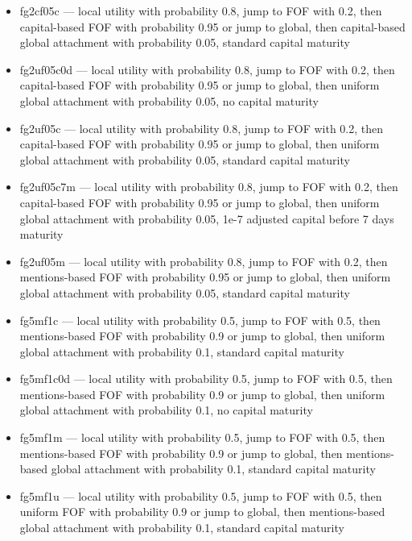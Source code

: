 \documentclass[10pt,oneside]{memoir}
\begin{document}
\begin{itemize}


\item fg2cf05c --- local utility with probability 0.8, jump to FOF with 0.2, then capital-based FOF with probability 0.95 or jump to global, then capital-based global attachment with probability 0.05, standard capital maturity

\item fg2uf05c0d --- local utility with probability 0.8, jump to FOF with 0.2, then capital-based FOF with probability 0.95 or jump to global, then uniform global attachment with probability 0.05, no capital maturity

\item fg2uf05c --- local utility with probability 0.8, jump to FOF with 0.2, then capital-based FOF with probability 0.95 or jump to global, then uniform global attachment with probability 0.05, standard capital maturity

\item fg2uf05c7m --- local utility with probability 0.8, jump to FOF with 0.2, then capital-based FOF with probability 0.95 or jump to global, then uniform global attachment with probability 0.05, 1e-7 adjusted capital before 7 days maturity

\item fg2uf05m --- local utility with probability 0.8, jump to FOF with 0.2, then mentions-based FOF with probability 0.95 or jump to global, then uniform global attachment with probability 0.05, standard capital maturity

\item fg5mf1c --- local utility with probability 0.5, jump to FOF with 0.5, then mentions-based FOF with probability 0.9 or jump to global, then uniform global attachment with probability 0.1, standard capital maturity

\item fg5mf1c0d --- local utility with probability 0.5, jump to FOF with 0.5, then mentions-based FOF with probability 0.9 or jump to global, then uniform global attachment with probability 0.1, no capital maturity

\item fg5mf1m --- local utility with probability 0.5, jump to FOF with 0.5, then mentions-based FOF with probability 0.9 or jump to global, then mentions-based global attachment with probability 0.1, standard capital maturity

\item fg5mf1u --- local utility with probability 0.5, jump to FOF with 0.5, then uniform FOF with probability 0.9 or jump to global, then mentions-based global attachment with probability 0.1, standard capital maturity


\end{itemize}
\end{document}
